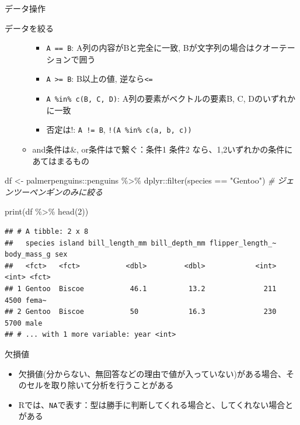 \documentclass[
  ignorenonframetext,
]{beamer}
\newenvironment{Shaded}{\begin{snugshade}}{\end{snugshade}}
\newcommand{\CommentTok}[1]{\textcolor[rgb]{0.56,0.35,0.01}{\textit{#1}}}
\newcommand{\DecValTok}[1]{\textcolor[rgb]{0.00,0.00,0.81}{#1}}
\newcommand{\FunctionTok}[1]{\textcolor[rgb]{0.00,0.00,0.00}{#1}}
\newcommand{\NormalTok}[1]{#1}
\newcommand{\OtherTok}[1]{\textcolor[rgb]{0.56,0.35,0.01}{#1}}
\newcommand{\SpecialCharTok}[1]{\textcolor[rgb]{0.00,0.00,0.00}{#1}}
\newcommand{\StringTok}[1]{\textcolor[rgb]{0.31,0.60,0.02}{#1}}
\providecommand{\tightlist}{%
  \setlength{\itemsep}{0pt}\setlength{\parskip}{0pt}}
\begin{document}
\begin{frame}[fragile]{データ操作}
\begin{block}{データを絞る}
\begin{itemize}
\begin{itemize}
    \begin{itemize}
    \tightlist
    \item
      \texttt{A\ ==\ B}: A列の内容がBと完全に一致,
      Bが文字列の場合はクオーテーションで囲う
    \item
      \texttt{A\ \textgreater{}=\ B}: B以上の値,
      逆なら\texttt{\textless{}=}
    \item
      \texttt{A\ \%in\%\ c(B,\ C,\ D)}: A列の要素がベクトルの要素B, C,
      Dのいずれかに一致
    \item
      否定は!: \texttt{A\ !=\ B}, \texttt{!(A\ \%in\%\ c(a,\ b,\ c))}
    \end{itemize}
  \item
    and条件は\&, or条件は\textbar で繋ぐ：条件1 \textbar{} 条件2
    なら、1,2いずれかの条件にあてはまるもの
  \end{itemize}
\end{itemize}

\begin{Shaded}
\begin{Highlighting}[]
\NormalTok{df }\OtherTok{\textless{}{-}}\NormalTok{ palmerpenguins}\SpecialCharTok{::}\NormalTok{penguins }\SpecialCharTok{\%\textgreater{}\%}
\NormalTok{  dplyr}\SpecialCharTok{::}\FunctionTok{filter}\NormalTok{(species }\SpecialCharTok{==} \StringTok{"Gentoo"}\NormalTok{) }\CommentTok{\# ジェンツーペンギンのみに絞る}

\FunctionTok{print}\NormalTok{(df }\SpecialCharTok{\%\textgreater{}\%} \FunctionTok{head}\NormalTok{(}\DecValTok{2}\NormalTok{))}
\end{Highlighting}
\end{Shaded}

\begin{verbatim}
## # A tibble: 2 x 8
##   species island bill_length_mm bill_depth_mm flipper_length_~ body_mass_g sex  
##   <fct>   <fct>           <dbl>         <dbl>            <int>       <int> <fct>
## 1 Gentoo  Biscoe           46.1          13.2              211        4500 fema~
## 2 Gentoo  Biscoe           50            16.3              230        5700 male 
## # ... with 1 more variable: year <int>
\end{verbatim}
\end{block}

\begin{block}{欠損値}
\protect\hypertarget{ux6b20ux640dux5024}{}
\begin{itemize}
\tightlist
\item
  欠損値(分からない、無回答などの理由で値が入っていない)がある場合、そのセルを取り除いて分析を行うことがある
\item
  Rでは、\texttt{NA}で表す：型は勝手に判断してくれる場合と、してくれない場合とがある


\end{itemize}
\end{block}
\end{frame}
\end{document}
